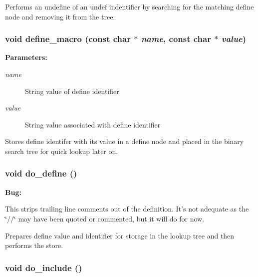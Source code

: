 Performs an undefine of an undef indentifier by searching for the matching define node and removing it from the tree. 
\subsubsection{\setlength{\rightskip}{0pt plus 5cm}void define\_\-macro (const char $\ast$ {\em name}, const char $\ast$ {\em value})}\label{pplexer_8c_a138}


\begin{Desc}
\item[{\bf Parameters: }]\par
\begin{description}
\item[
{\em name}]String value of define identifier \item[
{\em value}]String value associated with define identifier

\end{description}
\end{Desc}
Stores define identifer with its value in a define node and placed in the binary search tree for quick lookup later on. 
\subsubsection{\setlength{\rightskip}{0pt plus 5cm}void do\_\-define ()\hspace{0.3cm}{\tt  [static]}}\label{pplexer_8c_a130}




\begin{Desc}
\item[{\bf {\bf Bug: }}]\par
This strips trailing line comments out of the definition. It's not adequate as the \char`\"{}//\char`\"{} may have been quoted or commented, but it will do for now.\end{Desc}


Prepares define value and identifier for storage in the lookup tree and then performs the store. 
\subsubsection{\setlength{\rightskip}{0pt plus 5cm}void do\_\-include ()\hspace{0.3cm}{\tt  [static]}}\label{pplexer_8c_a133}


